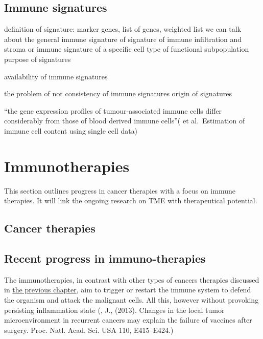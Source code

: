 \documentclass[12pt,]{book}
\theoremstyle{definition}
\theoremstyle{definition}
\theoremstyle{definition}
\theoremstyle{remark}
\begin{document}
\hypertarget{immune-signatures}{%
\subsection{Immune signatures}\label{immune-signatures}}

definition of signature: marker genes, list of genes, weighted list we
can talk about the general immune signature of signature of immune
infiltration and stroma or immune signature of a specific cell type of
functional subpopulation purpose of signatures

availability of immune signatures

the problem of not consistency of immune signatures origin of signatures

``the gene expression profiles of tumour-associated immune cells differ
considerably from those of blood derived immune cells''(\citet{Shelker}
et al.~Estimation of immune cell content using single cell data)

\hypertarget{immunotherapies}{%
\section{Immunotherapies}\label{immunotherapies}}

This section outlines progress in cancer therapies with a focus on
immune therapies. It will link the ongoing research on TME with
therapeutical potential.

\hypertarget{cancer_Therapies}{%
\subsection{Cancer therapies}\label{cancer_Therapies}}

\hypertarget{recent-progress-in-immuno-therapies}{%
\subsection{Recent progress in
immuno-therapies}\label{recent-progress-in-immuno-therapies}}

The immunotherapies, in contrast with other types of cancers therapies
discussed in \protect\hyperlink{cancer_Therapies}{the previous chapter},
aim to trigger or restart the immune system to defend the organism and
attack the malignant cells. All this, however without provoking
persisting inflammation state (\citet{Predina}, J., (2013). Changes in
the local tumor microenvironment in recurrent cancers may explain the
failure of vaccines after surgery. Proc. Natl. Acad. Sci. USA 110,
E415--E424.)
\end{document}

